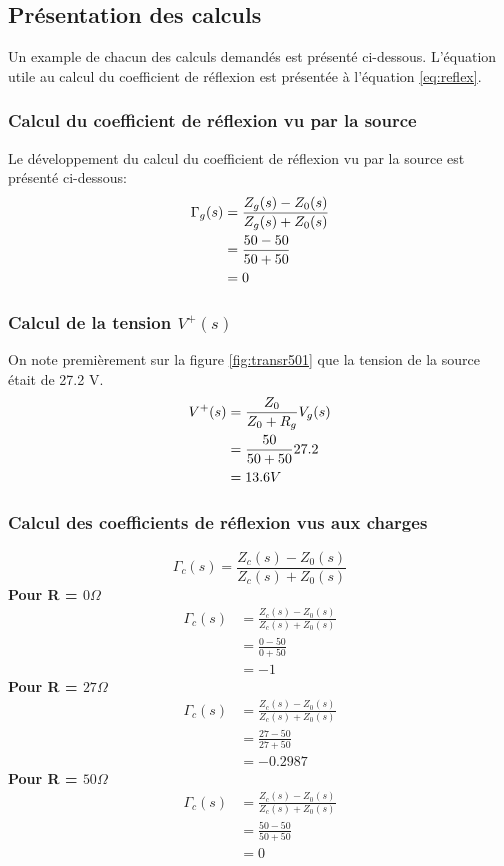 \subsection{Présentation des calculs}
Un example de chacun des calculs demandés est présenté ci-dessous.
L'équation utile au calcul du coefficient de réflexion est présentée à l'équation \ref{eq:reflex}. 
\subsubsection*{Calcul du coefficient de réflexion vu par la source}
Le développement du calcul du coefficient de réflexion vu par la source est présenté ci-dessous:
\begin{align}
\Gamma_g (s) &= \frac{Z_g(s) - Z_0(s)}{Z_g(s) + Z_0(s)}\\
		 &= \frac{50 - 50 }{50 + 50}\notag\\
		 &= 0\notag
\end{align}
\subsubsection*{Calcul de la tension $V^{+}(s)$}
On note premièrement sur la figure \ref{fig:transr501} que la tension de la source était de 27.2 V.
\begin{align}
V^{+}(s) &=  \frac{Z_0}{Z_0 + R_g} V_g (s)\\
		 &=	 \frac{50}{50 + 50} 27.2 \notag\\
		 &=  13.6V\notag
\end{align}

\subsubsection*{Calcul des coefficients de réflexion vus aux charges}
\begin{equation}
\Gamma_c (s) = \frac{Z_c(s) - Z_0(s)}{Z_c(s) + Z_0(s)}
\end{equation}
\textbf{Pour R = $0\Omega$}
\begin{align*}
\Gamma_c (s) &= \frac{Z_c(s) - Z_0(s)}{Z_c(s) + Z_0(s)}\\
			 &= \frac{0 - 50 }{0 + 50}\\
			 &= -1
\end{align*}
\textbf{Pour R = $27\Omega$}
\begin{align*}
\Gamma_c (s) &= \frac{Z_c(s) - Z_0(s)}{Z_c(s) + Z_0(s)}\\
			 &= \frac{27 - 50 }{27 + 50}\\
			 &= -0.2987
\end{align*}
\textbf{Pour R = $50\Omega$}
\begin{align*}
\Gamma_c (s) &= \frac{Z_c(s) - Z_0(s)}{Z_c(s) + Z_0(s)}\\
			 &= \frac{50 - 50 }{50 + 50}\\
			 &= 0
\end{align*}
\newpage
